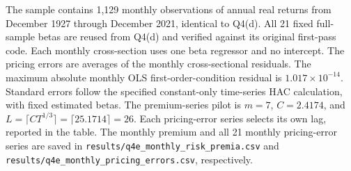 The sample contains 1,129 monthly observations of annual real returns from December 1927 through December 2021, identical to Q4(d).
All 21 fixed full-sample betas are reused from Q4(d) and verified against its original first-pass code.
Each monthly cross-section uses one beta regressor and no intercept.
The pricing errors are averages of the monthly cross-sectional residuals.
The maximum absolute monthly OLS first-order-condition residual is $1.017\times10^{-14}$.
Standard errors follow the specified constant-only time-series HAC calculation, with fixed estimated betas.
The premium-series pilot is $m=7$, $C=2.4174$,
and $L=\lceil CT^{1/3}\rceil=\lceil 25.1714\rceil=26$.
Each pricing-error series selects its own lag, reported in the table.
The monthly premium and all 21 monthly pricing-error series are saved in
\texttt{results/q4e\_monthly\_risk\_premia.csv} and
\texttt{results/q4e\_monthly\_pricing\_errors.csv}, respectively.
